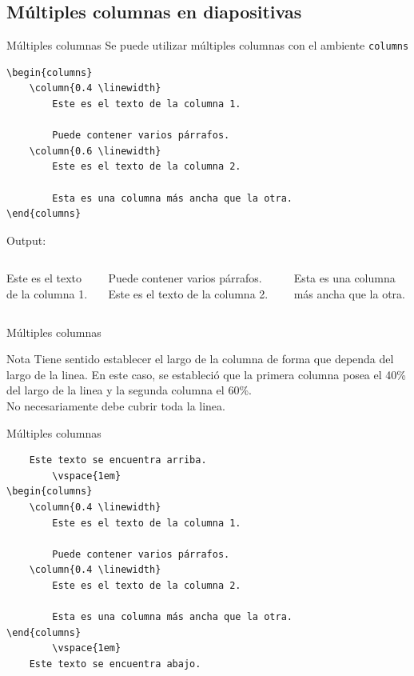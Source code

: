 \documentclass[../slides.tex]{subfiles}
\begin{document}
    \subsection{Múltiples columnas en diapositivas}

    \begin{frame}[fragile]{Múltiples columnas}
        Se puede utilizar múltiples columnas con el ambiente \texttt{columns}
        \begin{verbatim}
\begin{columns}
    \column{0.4 \linewidth}
        Este es el texto de la columna 1.
            
        Puede contener varios párrafos.
    \column{0.6 \linewidth}
        Este es el texto de la columna 2.
            
        Esta es una columna más ancha que la otra.
\end{columns}
        \end{verbatim}
    Output:
    
        \begin{columns}
                Este es el texto de la columna 1.

                Puede contener varios párrafos.
                Este es el texto de la columna 2.

                Esta es una columna más ancha que la otra.
        \end{columns}
     \end{frame}

     \begin{frame}{Múltiples columnas}
        \begin{block}{Nota}
            Tiene sentido establecer el largo de la columna de forma que dependa del largo de la linea. En este caso, se estableció que la primera columna posea el 40\% del largo de la linea y la segunda columna el 60\%.\\[\baselineskip]
            
            No necesariamente debe cubrir toda la linea.
        \end{block}
     \end{frame}
     
     \begin{frame}[fragile]{Múltiples columnas}
        \begin{verbatim}
    Este texto se encuentra arriba.
        \vspace{1em}
\begin{columns}
    \column{0.4 \linewidth}
        Este es el texto de la columna 1.
            
        Puede contener varios párrafos.
    \column{0.4 \linewidth}
        Este es el texto de la columna 2.
            
        Esta es una columna más ancha que la otra.
\end{columns}
        \vspace{1em}
    Este texto se encuentra abajo.
        \end{verbatim}
     \end{frame}
     
\end{document}

